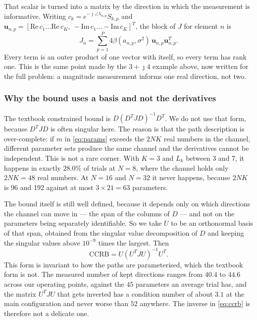 \documentclass[journal]{IEEEtran}
\begin{document}
That scalar is turned into a matrix by the direction in which the measurement
is informative. Writing $c_k=e^{-\jmath\angle\lambda_{n,p}}S_{k,p}$ and
$\mathbf{u}_{n,p}=[\mathrm{Re}\,c_1\ldots\mathrm{Re}\,c_K,\
-\mathrm{Im}\,c_1\ldots-\mathrm{Im}\,c_K]^T$, the block of $J$ for element $n$
is
\begin{equation}
J_n=\sum_{p=1}^{P}4\beta(a_{n,p},\sigma^2)\,
\mathbf{u}_{n,p}\mathbf{u}_{n,p}^{T} .
\label{eq:fisher}
\end{equation}
Every term is an outer product of one vector with itself, so every term has
rank one. This is the same point made by the $3+\jmath4$ example above,
now written for the full problem: a magnitude measurement informs one real
direction, not two.

\subsubsection{Why the bound uses a basis and not the derivatives}

The textbook constrained bound is $D(D^TJD)^{-1}D^T$. We do not use that form,
because $D^TJD$ is often singular here. The reason is that the path description
is over-complete: if $m$ in \eqref{eq:params} exceeds the $2NK$ real numbers in
the channel, different parameter sets produce the same channel and the
derivatives cannot be independent.
This is not a rare corner. With $K=3$ and $L_k$ between 3 and 7, it happens in
exactly $28.0\%$ of trials at $N=8$, where the channel holds only
$2NK=48$ real numbers. At $N=16$ and $N=32$ it never happens, because $2NK$ is
96 and 192 against at most $3\times21=63$ parameters.

The bound itself is still well defined, because it depends only on which
directions the channel can move in --- the span of the columns of $D$ --- and
not on the parameters being separately identifiable. So we take $U$ to be an
orthonormal basis of that span, obtained from the singular value decomposition
of $D$ and keeping the singular values above $10^{-9}$ times the largest. Then
\begin{equation}
\mathrm{CCRB}=U\!\left(U^TJU\right)^{-1}U^T .
\label{eq:ccrb}
\end{equation}
This form is invariant to how the paths are parameterised, which the textbook
form is not.
The measured number of kept directions ranges from $40.4$ to $44.6$ across our
operating points, against the $45$ parameters an average trial has, and the
matrix $U^TJU$ that gets inverted has a condition number of about $3.1$ at the
main configuration and never worse than $52$ anywhere. The inverse in
\eqref{eq:ccrb} is therefore not a delicate one.
\end{document}
